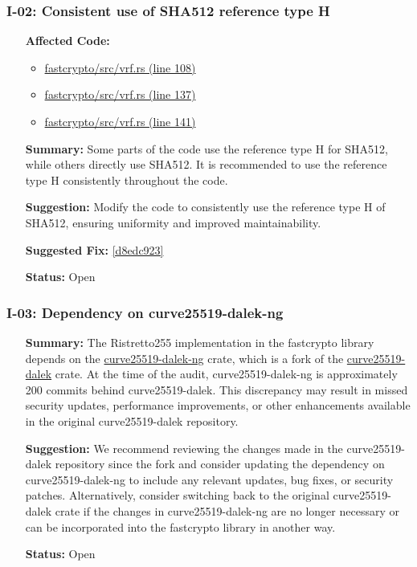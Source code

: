 \subsubsection*{I-02: Consistent use of SHA512 reference type H}
\begin{itemize}[align=left]
\item[\textbf{Affected Code:}]\
\begin{itemize}
\item \href{https://github.com/MystenLabs/fastcrypto/blob/963205c6d0538fe548b8b10037cf87a53af6f424/fastcrypto/src/vrf.rs#L108}{fastcrypto/src/vrf.rs (line 108)}
\item \href{https://github.com/MystenLabs/fastcrypto/blob/963205c6d0538fe548b8b10037cf87a53af6f424/fastcrypto/src/vrf.rs#L137}{fastcrypto/src/vrf.rs (line 137)}
\item \href{https://github.com/MystenLabs/fastcrypto/blob/963205c6d0538fe548b8b10037cf87a53af6f424/fastcrypto/src/vrf.rs#L141}{fastcrypto/src/vrf.rs (line 141)}
\end{itemize}
\item[\textbf{Summary:}] Some parts of the code use the reference type H for SHA512, while others directly use SHA512. It is recommended to use the reference type H consistently throughout the code.
\item[\textbf{Suggestion:}] Modify the code to consistently use the reference type H of SHA512, ensuring uniformity and improved maintainability.
\item[\textbf{Suggested Fix:}] \href{https://github.com/MystenLabs/fastcrypto/pull/543/commits/d8edc92340dd957f4bd05c356379be7ffa0916a5}{[d8edc923]}
\item[\textbf{Status:}] Open
\end{itemize}

\subsubsection*{I-03: Dependency on curve25519-dalek-ng}
\begin{itemize}[align=left]
    \item[\textbf{Summary:}] The Ristretto255 implementation in the fastcrypto library depends on the \href{https://github.com/zkcrypto/curve25519-dalek-ng}{curve25519-dalek-ng} crate, which is a fork of the \href{https://github.com/dalek-cryptography/curve25519-dalek}{curve25519-dalek} crate. At the time of the audit, curve25519-dalek-ng is approximately 200 commits behind curve25519-dalek. This discrepancy may result in missed security updates, performance improvements, or other enhancements available in the original curve25519-dalek repository.
    \item[\textbf{Suggestion:}] We recommend reviewing the changes made in the curve25519-dalek repository since the fork and consider updating the dependency on curve25519-dalek-ng to include any relevant updates, bug fixes, or security patches. Alternatively, consider switching back to the original curve25519-dalek crate if the changes in curve25519-dalek-ng are no longer necessary or can be incorporated into the fastcrypto library in another way.
    \item[\textbf{Status:}] Open
\end{itemize}

